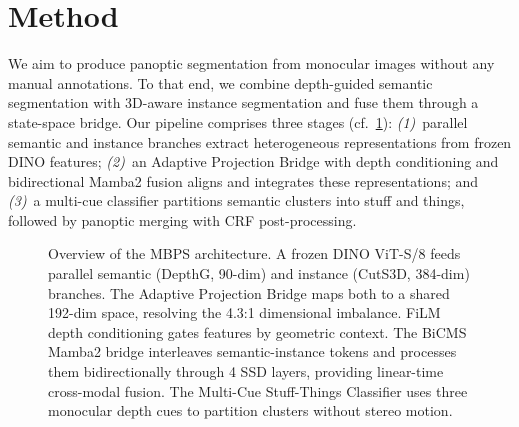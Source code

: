 \documentclass[10pt,twocolumn,letterpaper]{article}
\begin{document}
\section{Method}
\label{sec:method}

We aim to produce panoptic segmentation from monocular images without any manual annotations. To that end, we combine depth-guided semantic segmentation with 3D-aware instance segmentation and fuse them through a state-space bridge. Our pipeline comprises three stages (cf.~\cref{fig:architecture}): \emph{(1)}~parallel semantic and instance branches extract heterogeneous representations from frozen DINO features; \emph{(2)}~an Adaptive Projection Bridge with depth conditioning and bidirectional Mamba2 fusion aligns and integrates these representations; and \emph{(3)}~a multi-cue classifier partitions semantic clusters into stuff and things, followed by panoptic merging with CRF post-processing.

\begin{figure}[t]
    \centering
    \caption{Overview of the MBPS architecture. A frozen DINO ViT-S/8 feeds parallel semantic (DepthG, 90-dim) and instance (CutS3D, 384-dim) branches. The Adaptive Projection Bridge maps both to a shared 192-dim space, resolving the 4.3:1 dimensional imbalance. FiLM depth conditioning gates features by geometric context. The BiCMS Mamba2 bridge interleaves semantic-instance tokens and processes them bidirectionally through 4 SSD layers, providing linear-time cross-modal fusion. The Multi-Cue Stuff-Things Classifier uses three monocular depth cues to partition clusters without stereo motion.}
    \label{fig:architecture}
\end{figure}
\end{document}
